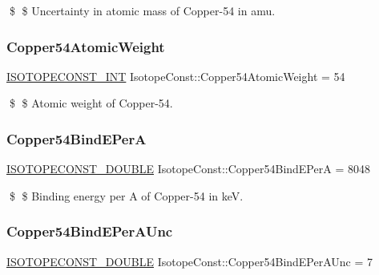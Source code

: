 \$ \$ Uncertainty in atomic mass of Copper-\/54 in amu. \mbox{\label{group___isotope_const-_copper-_cu54_ga7bad7820a3dd78fd0e4e69fd4ae829d2}} 
\subsubsection{\texorpdfstring{Copper54\+Atomic\+Weight}{Copper54AtomicWeight}}
{\footnotesize\ttfamily \mbox{\hyperlink{group___isotope_const-_macros_ga5f18360b3e99483a35c32d789e62621c}{I\+S\+O\+T\+O\+P\+E\+C\+O\+N\+S\+T\+\_\+\+I\+NT}} Isotope\+Const\+::\+Copper54\+Atomic\+Weight = 54}

\$ \$ Atomic weight of Copper-\/54. \mbox{\label{group___isotope_const-_copper-_cu54_ga8d4bde1a57bc555d76df8e80e1d17199}} 
\subsubsection{\texorpdfstring{Copper54\+Bind\+E\+PerA}{Copper54BindEPerA}}
{\footnotesize\ttfamily \mbox{\hyperlink{group___isotope_const-_macros_ga8f45a7272ce02c0b4c65c44636ed719a}{I\+S\+O\+T\+O\+P\+E\+C\+O\+N\+S\+T\+\_\+\+D\+O\+U\+B\+LE}} Isotope\+Const\+::\+Copper54\+Bind\+E\+PerA = 8048}

\$ \$ Binding energy per A of Copper-\/54 in keV. \mbox{\label{group___isotope_const-_copper-_cu54_ga6581968718e0ce2728f38b586884266a}} 
\subsubsection{\texorpdfstring{Copper54\+Bind\+E\+Per\+A\+Unc}{Copper54BindEPerAUnc}}
{\footnotesize\ttfamily \mbox{\hyperlink{group___isotope_const-_macros_ga8f45a7272ce02c0b4c65c44636ed719a}{I\+S\+O\+T\+O\+P\+E\+C\+O\+N\+S\+T\+\_\+\+D\+O\+U\+B\+LE}} Isotope\+Const\+::\+Copper54\+Bind\+E\+Per\+A\+Unc = 7}

